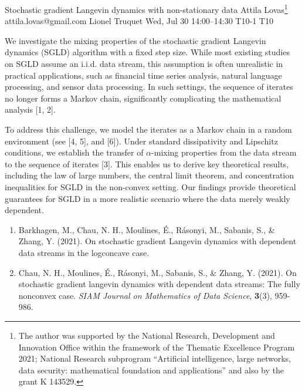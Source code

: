 \begin{talk}
  {Stochastic gradient Langevin dynamics with non-stationary data}%
  {Attila Lovas\footnote{The author was supported by the National Research, Development and Innovation Office within the framework of the Thematic Excellence Program 2021; National Research subprogram “Artificial intelligence, large networks, data security: mathematical foundation and applications” and also by the grant K 143529.}}%
  {attila.lovas@gmail.com}%
  {Lionel Truquet}%
  {}%
  {}%
  {Wed, Jul 30 14:00–14:30}%
  {T10-1}%
  {T10}%
  
				
		
We investigate the mixing properties of the stochastic gradient Langevin dynamics (SGLD) algorithm with a fixed step size. While most existing studies on SGLD assume an i.i.d. data stream, this assumption is often unrealistic in practical applications, such as financial time series analysis, natural language processing, and sensor data processing. In such settings, the sequence of iterates no longer forms a Markov chain, significantly complicating the mathematical analysis [1, 2].

To address this challenge, we model the iterates as a Markov chain in a random environment (see [4, 5], and [6]). Under standard dissipativity and Lipschitz conditions, we establish the transfer of $\alpha$-mixing properties from the data stream to the sequence of iterates [3]. This enables us to derive key theoretical results, including the law of large numbers, the central limit theorem, and concentration inequalities for SGLD in the non-convex setting. Our findings provide theoretical guarantees for SGLD in a more realistic scenario where the data merely weakly dependent.
		
\medskip

\begin{enumerate}
	
	\item[{[1]}] Barkhagen, M., Chau, N. H., Moulines, \'E., R\'asonyi, M., Sabanis, S., \& Zhang, Y. (2021). On stochastic gradient Langevin dynamics with dependent data streams in the logconcave case.
	
	\item[{[2]}] Chau, N. H., Moulines, \'E., R\'asonyi, M., Sabanis, S., \& Zhang, Y. (2021). On stochastic gradient langevin dynamics with dependent data streams: The fully nonconvex case. {\it SIAM Journal on Mathematics of Data Science}, \textbf{3}(3), 959-986.
	

\end{enumerate}
\end{talk}

